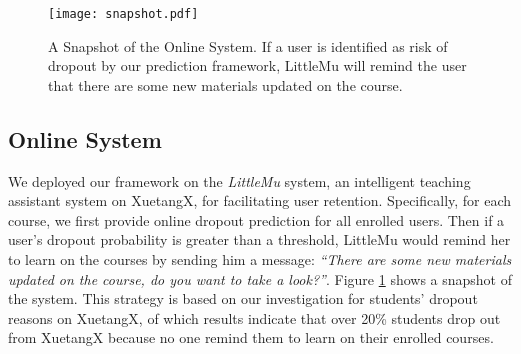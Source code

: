 	\begin{figure}
		\centering
		\texttt{[image: snapshot.pdf]}
		
		\caption{A Snapshot of the Online System. If a user is identified as risk of dropout by our prediction framework, LittleMu will remind the user that there are some new materials updated on the course.} 
		\label{fig:snapshot}
	\end{figure}
	\subsection{Online System}
	We deployed our framework on the \textit{LittleMu} system, an intelligent teaching assistant system on XuetangX, for facilitating user retention.
	Specifically, for each course, we first provide online dropout prediction for all enrolled users. Then if a user's dropout probability is greater than a threshold, LittleMu would remind her to learn on the courses by sending him a message: \emph{``There are some new materials updated on the course, do you want to take a look?''}. Figure \ref{fig:snapshot} shows a snapshot of the system. This strategy is
based on our investigation for students' dropout reasons on XuetangX,  of which results indicate that over
20\% students drop out from XuetangX because no one remind them to learn on their enrolled courses.
		